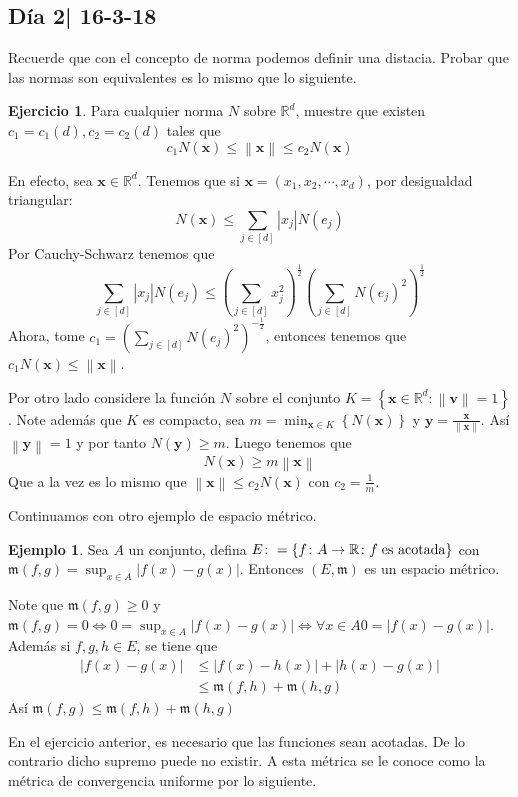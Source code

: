 \documentclass[12pt]{article}
\theoremstyle{plain}
\theoremstyle{definition}
\newtheorem{Ex}[Th]{Ejemplo}               %
\newtheorem{Ej}[Th]{Ejercicio}
\theoremstyle{remark}
\numberwithin{equation}{section}
\newcommand{\bR}{\mathbb{R}}        %
\newcommand{\mm}{\mathfrak{m}}      %
\renewcommand{\geq}{\geqslant}      %
\renewcommand{\leq}{\leqslant}      %
\renewcommand{\:}{\colon}           %
\renewcommand{\vec}[1]{\mathbf{#1}}
\newcommand{\vx}{\vec{x}}           %
\newcommand{\vy}{\vec{y}}
\newcommand{\conj}[1]{\left\lbrace#1\right\rbrace}
\newcommand{\bonj}[1]{\left\lbrack#1\right\rbrack}
\newcommand{\nm}[1]{\left\|#1\right\|} %
\begin{document}
\begin{multicols}{2}
\subsection{Día 2| 16-3-18}

Recuerde que con el concepto de norma podemos definir una distacia. Probar que las normas son equivalentes es lo mismo que lo siguiente.

\begin{Ej}
  Para cualquier norma $N$ sobre $\bR^d$, muestre que existen $c_1=c_1(d), c_2=c_2(d)$ tales que $$c_1N(\vx)\leq\nm{\vx}\leq c_2N(\vx)$$
\end{Ej}


\begin{ptcb}
En efecto, sea $\vx\in\bR^d$. Tenemos que si $\vx=(x_1,x_2,\cdots,x_d)$, por desigualdad triangular:
$$N(\vx)\leq\sum_{j\in\bonj{d}}|x_j|N(e_j)$$
Por Cauchy-Schwarz tenemos que
$$\sum_{j\in\bonj{d}}|x_j|N(e_j)\leq\left(\sum_{j\in\bonj{d}}x_j^2\right)^{\frac{1}{2}}\left(\sum_{j\in\bonj{d}}N(e_j)^2\right)^{\frac{1}{2}}$$
Ahora, tome $c_1=\left(\sum_{j\in\bonj{d}}N(e_j)^2\right)^{-\frac{1}{2}}$, entonces tenemos que $c_1N(\vx)\leq \nm{\vx}$.\par
Por otro lado considere la función $N$ sobre el conjunto $K=\conj{\vx\in\bR^d\: \nm{\vec{v}}=1}$. Note además que $K$ es compacto, sea $m=\min_{\vx\in K}\conj{N(\vx)}$ y $\vy=\frac{\vx}{\nm{\vx}}$. Así $\nm{\vy}=1$ y por tanto $N(\vy)\geq m$. Luego tenemos que $$N(\vx)\geq m\nm{\vx}$$
Que a la vez es lo mismo que $\nm{\vx}\leq c_2N(\vx)$ con $c_2=\frac{1}{m}$.
\end{ptcb}

Continuamos con otro ejemplo de espacio métrico.

\begin{Ex}
Sea $A$ un conjunto, defina $E\colon=\conj{f\colon A\to\bR\colon f\hspace{1mm}\text{es acotada}}$ con $\mm(f,g)=\sup_{x\in A}|f(x)-g(x)|$. Entonces $(E,\mm)$ es un espacio métrico.
\end{Ex}

\begin{ptcbp}
Note que $\mm(f,g)\geq 0$ y $\mm(f,g)=0\iff 0=\sup_{x\in A}|f(x)-g(x)|\iff \forall x\in A 0=|f(x)-g(x)|$. Además si $f,g,h\in E$, se tiene que
\begin{align*}
  |f(x)-g(x)| &\leq |f(x)-h(x)|+|h(x)-g(x)| \\
&\leq \mm(f,h)+\mm(h,g)
\end{align*}
Así $\mm(f,g)\leq \mm(f,h)+\mm(h,g)$
\end{ptcbp}
En el ejercicio anterior, es necesario que las funciones sean acotadas. De lo contrario dicho supremo puede no existir.
A esta métrica se le conoce como la métrica de convergencia uniforme por lo siguiente.


\end{multicols}
\end{document}
